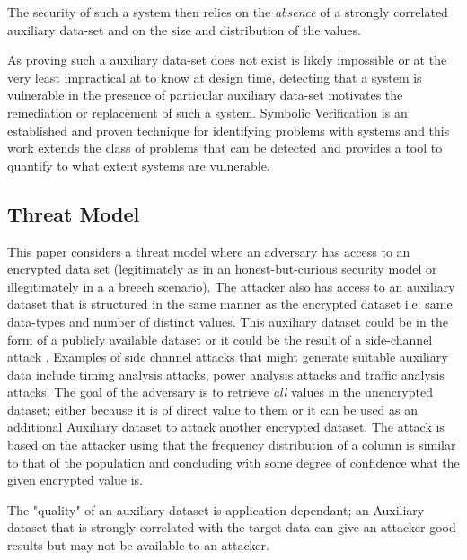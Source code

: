 \documentclass[journal]{IEEEtran}
\begin{document}
The security of such a system then relies on the \textit{absence} of a strongly correlated auxiliary data-set and on the size and distribution of the values. 

As proving such a auxiliary data-set does not exist is likely impossible or at the very least impractical at to know at design time, detecting that a system is vulnerable in the presence of particular auxiliary data-set motivates the remediation or replacement of such a system. Symbolic Verification is an established and proven technique for identifying problems with systems and this work extends the class of problems that can be detected and provides a tool to quantify to what extent systems are vulnerable.


\subsection{Threat Model}
This paper considers a threat model where an adversary has access to an encrypted data set (legitimately as in an honest-but-curious security model or illegitimately in a a breech scenario). 
The attacker also has access to an auxiliary dataset that is structured in the same manner as the encrypted dataset i.e. same data-types and number of distinct values. This auxiliary dataset could be in the form of a publicly available dataset or it could be the result of a side-channel attack \cite{Kocher96}. Examples of side channel attacks that might generate suitable auxiliary data include timing analysis attacks, power analysis attacks and traffic analysis attacks\cite{SideChannelSurvey}.
The goal of the adversary is to retrieve \textit{all} values in the unencrypted dataset; either because it is of direct value to them or it can be used as an additional Auxiliary dataset to attack another encrypted dataset. 
The attack is based on the attacker using that the frequency distribution of a column is similar to that of the population and concluding with some degree of confidence what the  given encrypted value is. 

The "quality" of an auxiliary dataset is application-dependant\cite{InfrenceAttacks}; an Auxiliary dataset that is strongly correlated with the target data can give an attacker good results but may not be available to an attacker. 

\end{document}
